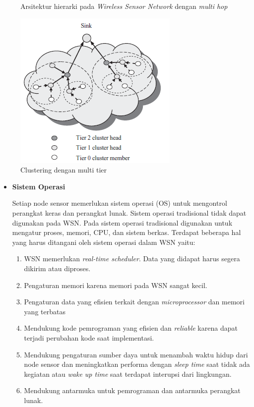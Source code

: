 \documentclass[a4paper,twoside]{article}
\begin{document}
\begin{enumerate}
\begin{itemize}
\begin{itemize}
\begin{figure} [H]
	\caption[Arsitektur hierarki pada \textit{Wireless Sensor Network} dengan \textit{multi hop}]{Arsitektur hierarki pada \textit{Wireless Sensor Network} dengan \textit{multi hop}} 
	\label{fig:cluster_multi} 
\end{figure} 
\begin{figure} [H]
	\centering  
	\includegraphics[scale=0.7]{Gambar/cluster_multitier}  
	\caption[Clsutering dengan multi tier]{Clustering dengan multi tier} 
	\label{fig:cluster_multitier} 
\end{figure}
\end{itemize}
		\end{itemize}
		
		\begin{itemize}
		\item \textbf{Sistem Operasi}
		
		Setiap node sensor memerlukan sistem operasi (OS) untuk mengontrol perangkat keras dan perangkat lunak. Sistem operasi tradisional tidak dapat digunakan pada WSN. Pada sistem operasi tradisional digunakan untuk mengatur proses, memori, CPU, dan sistem berkas. Terdapat beberapa hal yang harus ditangani oleh sistem operasi dalam WSN yaitu:
\begin{enumerate}
	\item WSN memerlukan \textit{real-time scheduler}. Data yang didapat harus segera dikirim atau diproses.
	\item Pengaturan memori karena memori pada WSN sangat kecil.
	\item Pengaturan data yang efisien terkait dengan \textit{microprocessor} dan memori yang terbatas
	\item Mendukung kode pemrograman yang efisien dan \textit{reliable} karena dapat terjadi perubahan kode saat implementasi.
	\item Mendukung pengaturan sumber daya untuk menambah waktu hidup dari node sensor dan meningkatkan performa dengan \textit{sleep time} saat tidak ada kegiatan atau \textit{wake up time} saat terdapat interupsi dari lingkungan.
	\item Mendukung antarmuka untuk pemrograman dan antarmuka perangkat lunak. 
\end{enumerate}


\end{itemize}
\end{enumerate}
\end{document}
